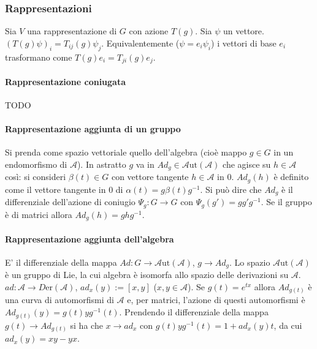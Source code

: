 \documentclass[12pt,oneside,notitlepage,abstracton,a4paper]{scrartcl}
\newcommand{\A}{\mathcal{A}}
\begin{document}
\subsubsection{Rappresentazioni} Sia $V$ una rappresentazione di $G$ con azione $T(g)$. Sia $\psi$ un vettore. $(T(g) \psi)_i = T_{ij}(g) \psi_j$. Equivalentemente ($\psi = e_i \psi_i$) i vettori di base $e_i$ trasformano come $T(g)e_i = T_{ji}(g) e_j$.

\paragraph{Rappresentazione coniugata} TODO

\paragraph{Rappresentazione aggiunta di un gruppo} Si prenda come spazio vettoriale quello dell'algebra (cioè mappo $g\in G$ in un endomorfismo di $\A$). In astratto $g$ va in $Ad_g \in \A \mathrm{ut}(\A)$ che agisce su $h\in \A$ così: si consideri $\beta(t)\in G$ con vettore tangente $h\in \A$ in 0. $Ad_g(h)$ è definito come il vettore tangente in 0 di $\alpha(t) = g\beta(t) g^{-1}$. Si può dire che $Ad_g$ è il differenziale dell'azione di coniugio $\Psi_g: G\rightarrow G$ con $\Psi_g(g') = gg'g^{-1}$. Se il gruppo è di matrici allora $Ad_g(h) = ghg^{-1}$.

\paragraph{Rappresentazione aggiunta dell'algebra} E' il differenziale della mappa $Ad: G\rightarrow \A \mathrm{ut}(\A)$, $g\rightarrow Ad_g$. Lo spazio $\A \mathrm{ut}(\A)$ è un gruppo di Lie, la cui algebra è isomorfa allo spazio delle derivazioni su $\A$. $ad: \A \rightarrow D\mathrm{er}(\A)$, $ad_x(y) := [x,y]$ ($x,y\in \A$). Se $g(t) = e^{tx}$ allora $Ad_{g(t)}$ è una curva di automorfismi di $\A$ e, per matrici, l'azione di questi automorfismi è $Ad_{g(t)}(y) = g(t) y g^{-1}(t)$. Prendendo il differenziale della mappa $g(t) \rightarrow Ad_{g(t)}$ si ha che $x \rightarrow ad_x$ con $g(t) y g^{-1}(t) = 1 + ad_x(y) t$, da cui $ad_x(y) = xy-yx$.
\end{document}
